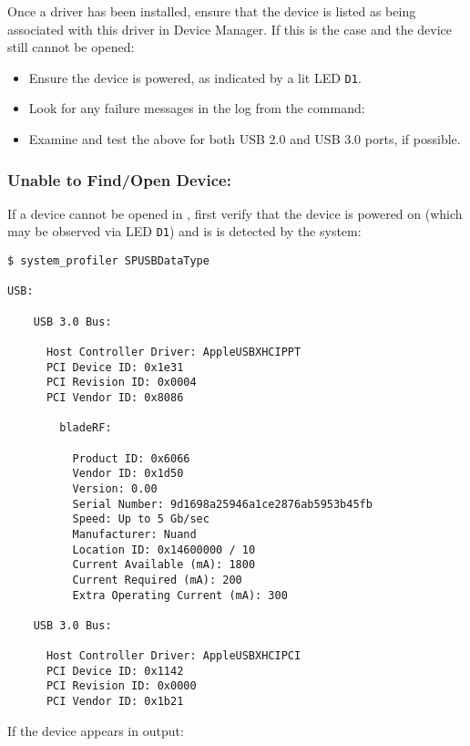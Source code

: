 Once a driver has been installed, ensure that the device is listed as
being associated with this driver in Device Manager. If this is the case
and the device still cannot be opened:

\begin{itemize}
    \item Ensure the device is powered, as indicated by a lit LED \texttt{D1}.
    \item Look for any failure messages in the log from the command:\\
    \item Examine and test the above for both USB 2.0 and USB 3.0 ports, if possible.
\end{itemize}

\subsubsection{Unable to Find/Open Device: \osx}\label{sec:open-osx}

If a device cannot be opened in \osx, first verify that the device is
powered on (which may be observed via LED \texttt{D1}) and is
is detected by the system:

\begin{lstlisting}[style=snippet, caption=\cmd{system\_profiler} output showing connected \bladerf]
$ system_profiler SPUSBDataType

USB:

    USB 3.0 Bus:

      Host Controller Driver: AppleUSBXHCIPPT
      PCI Device ID: 0x1e31
      PCI Revision ID: 0x0004
      PCI Vendor ID: 0x8086

        bladeRF:

          Product ID: 0x6066
          Vendor ID: 0x1d50
          Version: 0.00
          Serial Number: 9d1698a25946a1ce2876ab5953b45fb
          Speed: Up to 5 Gb/sec
          Manufacturer: Nuand
          Location ID: 0x14600000 / 10
          Current Available (mA): 1800
          Current Required (mA): 200
          Extra Operating Current (mA): 300

    USB 3.0 Bus:

      Host Controller Driver: AppleUSBXHCIPCI
      PCI Device ID: 0x1142
      PCI Revision ID: 0x0000
      PCI Vendor ID: 0x1b21
\end{lstlisting}

If the device appears in  output:

